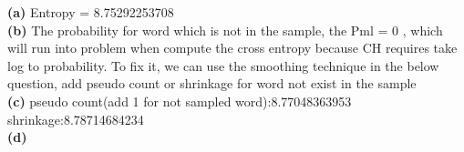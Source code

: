 \documentclass[11pt]{article}
\renewcommand\part[1]{\vspace{.20in}\textbf{(#1)}}
\begin{document}
\part{a}
Entropy = 8.75292253708\\
\part{b}
The probability for word which is not in the sample, the Pml = 0 , which will run into problem when compute the cross entropy because CH requires take log to probability. To fix it, we can use the smoothing technique in the below question, add pseudo count or shrinkage for word not exist in the sample\\
\part{c}
pseudo count(add 1 for not sampled word):8.77048363953\\
shrinkage:8.78714684234\\
\part{d}
\end{document}
